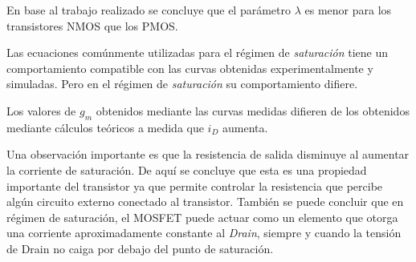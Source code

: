 \documentclass[10pt,spanish,a4paper,openany,notitlepage]{article}
\begin{document}
En base al trabajo realizado se concluye que el parámetro $\lambda$ es menor para los transistores NMOS que los PMOS.

Las ecuaciones comúnmente utilizadas para el régimen de \emph{saturación} tiene un comportamiento compatible con las curvas obtenidas experimentalmente y simuladas. Pero en el régimen de \emph{saturación} su comportamiento difiere.

Los valores de $g_m$ obtenidos mediante las curvas medidas difieren de los obtenidos mediante cálculos teóricos a medida que $i_D$ aumenta.

Una observación importante es que la resistencia de salida disminuye
al aumentar la corriente de saturación. De aquí se concluye que esta es una propiedad
importante del transistor ya que permite controlar la resistencia que
percibe algún circuito externo conectado al transistor. También se
puede concluir que en régimen de saturación, el MOSFET puede actuar
como un elemento que otorga una corriente aproximadamente constante al \emph{Drain}, siempre y cuando la tensión de Drain no caiga por debajo del punto de saturación.
\end{document}
